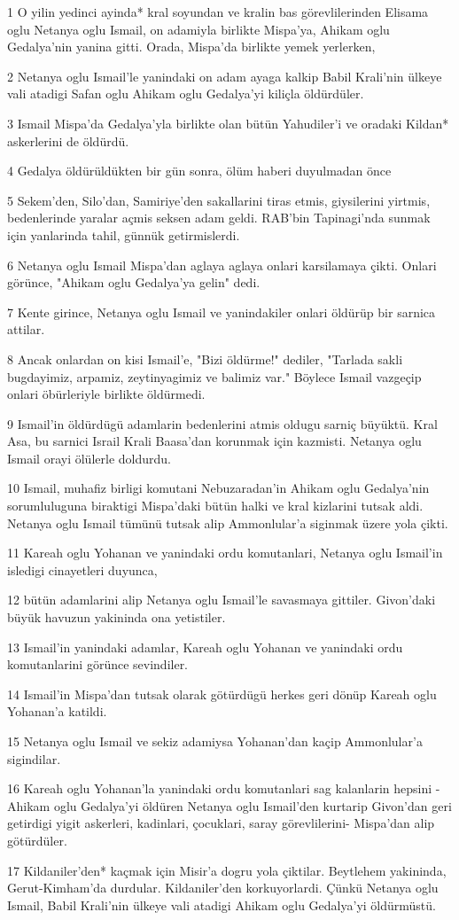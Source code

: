 \par 1 O yilin yedinci ayinda* kral soyundan ve kralin bas görevlilerinden Elisama oglu Netanya oglu Ismail, on adamiyla birlikte Mispa'ya, Ahikam oglu Gedalya'nin yanina gitti. Orada, Mispa'da birlikte yemek yerlerken,
\par 2 Netanya oglu Ismail'le yanindaki on adam ayaga kalkip Babil Krali'nin ülkeye vali atadigi Safan oglu Ahikam oglu Gedalya'yi kiliçla öldürdüler.
\par 3 Ismail Mispa'da Gedalya'yla birlikte olan bütün Yahudiler'i ve oradaki Kildan* askerlerini de öldürdü.
\par 4 Gedalya öldürüldükten bir gün sonra, ölüm haberi duyulmadan önce
\par 5 Sekem'den, Silo'dan, Samiriye'den sakallarini tiras etmis, giysilerini yirtmis, bedenlerinde yaralar açmis seksen adam geldi. RAB'bin Tapinagi'nda sunmak için yanlarinda tahil, günnük getirmislerdi.
\par 6 Netanya oglu Ismail Mispa'dan aglaya aglaya onlari karsilamaya çikti. Onlari görünce, "Ahikam oglu Gedalya'ya gelin" dedi.
\par 7 Kente girince, Netanya oglu Ismail ve yanindakiler onlari öldürüp bir sarnica attilar.
\par 8 Ancak onlardan on kisi Ismail'e, "Bizi öldürme!" dediler, "Tarlada sakli bugdayimiz, arpamiz, zeytinyagimiz ve balimiz var." Böylece Ismail vazgeçip onlari öbürleriyle birlikte öldürmedi.
\par 9 Ismail'in öldürdügü adamlarin bedenlerini atmis oldugu sarniç büyüktü. Kral Asa, bu sarnici Israil Krali Baasa'dan korunmak için kazmisti. Netanya oglu Ismail orayi ölülerle doldurdu.
\par 10 Ismail, muhafiz birligi komutani Nebuzaradan'in Ahikam oglu Gedalya'nin sorumluluguna biraktigi Mispa'daki bütün halki ve kral kizlarini tutsak aldi. Netanya oglu Ismail tümünü tutsak alip Ammonlular'a siginmak üzere yola çikti.
\par 11 Kareah oglu Yohanan ve yanindaki ordu komutanlari, Netanya oglu Ismail'in isledigi cinayetleri duyunca,
\par 12 bütün adamlarini alip Netanya oglu Ismail'le savasmaya gittiler. Givon'daki büyük havuzun yakininda ona yetistiler.
\par 13 Ismail'in yanindaki adamlar, Kareah oglu Yohanan ve yanindaki ordu komutanlarini görünce sevindiler.
\par 14 Ismail'in Mispa'dan tutsak olarak götürdügü herkes geri dönüp Kareah oglu Yohanan'a katildi.
\par 15 Netanya oglu Ismail ve sekiz adamiysa Yohanan'dan kaçip Ammonlular'a sigindilar.
\par 16 Kareah oglu Yohanan'la yanindaki ordu komutanlari sag kalanlarin hepsini -Ahikam oglu Gedalya'yi öldüren Netanya oglu Ismail'den kurtarip Givon'dan geri getirdigi yigit askerleri, kadinlari, çocuklari, saray görevlilerini- Mispa'dan alip götürdüler.
\par 17 Kildaniler'den* kaçmak için Misir'a dogru yola çiktilar. Beytlehem yakininda, Gerut-Kimham'da durdular. Kildaniler'den korkuyorlardi. Çünkü Netanya oglu Ismail, Babil Krali'nin ülkeye vali atadigi Ahikam oglu Gedalya'yi öldürmüstü.

